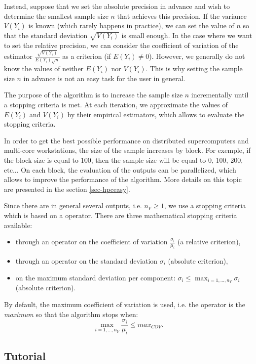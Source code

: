 \documentclass{article}
\begin{document}
Instead, suppose that we set the absolute precision in advance and wish to determine the smallest sample 
size $n$ that achieves this precision. 
If the variance $V(Y_i)$ is known (which rarely happens in practice), we can set the value of $n$ 
so that the standard deviation $\sqrt{V(Y_i)}$ is small enough. 
In the case where we want to set the relative precision, we can consider the coefficient of variation 
of the estimator $\frac{\sqrt{V(Y_i)}}{E(Y_i)\sqrt{n}}$ as a criterion (if $E(Y_i)\neq 0$). 
However, we generally do not know the values of neither $E(Y_i)$ nor $V(Y_i)$. 
This is why setting the sample size $n$ in advance is not an easy task for the 
user in general. 

The purpose of the algorithm is to increase the 
sample size $n$ incrementally until a stopping criteria is met. 
At each iteration, we approximate the values of $E(Y_i)$ and $V(Y_i)$ 
by their empirical estimators, which allows to evaluate the stopping criteria. 

In order to get the best possible performance on distributed supercomputers and 
multi-core workstations, the size of the sample increases by block. 
For exemple, if the block size is equal to 100, then the sample size will be equal to 0, 100, 
200, etc... 
On each block, the evaluation of the outputs can be parallelized, which allows to improve the 
performance of the algorithm.
More details on this topic are presented in the section \ref{sec-hpceasy}. 

Since there are in general several outputs, i.e. $n_Y\geq 1$, we use 
a stopping criteria which is based on a operator. 
There are three mathematical stopping criteria available:
\begin{itemize} 
\item through an operator on the coefficient of variation $\frac{\sigma_i}{\mu_i}$ (a relative criterion),
\item through an operator on the standard deviation $\sigma_i$ (absolute criterion),
\item on the maximum standard deviation per component: $\sigma_i \leq \max_{i=1,...,n_Y} \sigma_i$ (absolute criterion).
\end{itemize} 

By default, the maximum coefficient of variation is used, i.e. the operator is the \emph{maximum} 
so that the algorithm stops when: 
$$
\max_{i=1,...,n_Y} \frac{\sigma_i}{\mu_i} \leq max_{COV}.
$$

\subsection{Tutorial}
\end{document}
